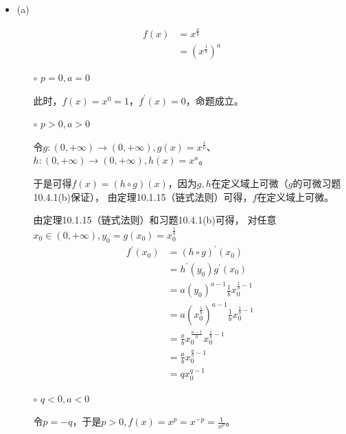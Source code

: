 \documentclass{article}
\begin{document}
\begin{itemize}
  \item (a)

        \begin{align*}
          f(x) & = x^{\frac{a}{b}}     \\
               & = (x^{\frac{1}{b}})^a
        \end{align*}

        \begin{itemize}
          \item[$\circ$]  $p = 0, a = 0$

                此时，$f(x) = x^0 = 1$，$f^\prime(x) = 0$，命题成立。
          \item[$\circ$]  $p > 0, a > 0$

                令$g : (0, +\infty) \to (0, +\infty), g(x) = x^{\frac{1}{b}}$、
                $h : (0, +\infty) \to (0, +\infty), h(x) = x^a$。

                于是可得$f(x) = (h \circ g)(x)$，因为$g, h$在定义域上可微（$g$的可微习题10.4.1(b)保证），
                由定理10.1.15（链式法则）可得，$f$在定义域上可微。

                由定理10.1.15（链式法则）和习题10.4.1(b)可得，
                对任意$x_0 \in (0, +\infty), y_0 = g(x_0) = x_0^{\frac{1}{b}}$
                \begin{align*}
                  f^\prime(x_0) & = (h \circ g)^\prime(x_0)                                      \\
                                & = h^\prime(y_0)g^\prime(x_0)                                   \\
                                & = a(y_0)^{a - 1}\frac{1}{b}x_0^{\frac{1}{b} - 1}               \\
                                & = a(x_0^{\frac{1}{b}})^{a - 1}\frac{1}{b}x_0^{\frac{1}{b} - 1} \\
                                & = \frac{a}{b}x_0^{\frac{a-1}{b}} x_0^{\frac{1}{b} - 1}         \\
                                & = \frac{a}{b}x_0^{\frac{a}{b} - 1}                             \\
                                & = q x_0^{q - 1}
                \end{align*}

          \item[$\circ$] $q < 0, a < 0$

                令$p = -q$，于是$p > 0, f(x) = x^p = x^{-p} = \frac{1}{x^p}$。


\end{itemize}
\end{itemize}
\end{document}

